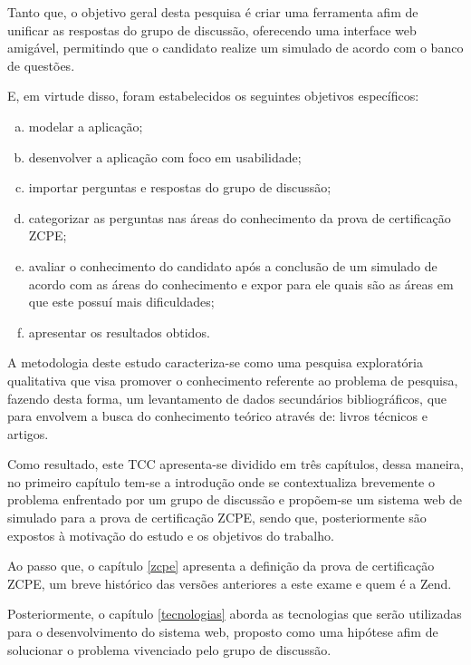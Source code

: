 
Tanto que, o objetivo geral desta pesquisa é criar uma ferramenta afim de
unificar as respostas do grupo de discussão, oferecendo uma interface web
amigável, permitindo que o candidato realize um simulado de
acordo com o banco de questões.


E, em virtude disso, foram estabelecidos os seguintes objetivos
específicos:

\begin{enumerate}[a)]
    \item modelar a aplicação;
    \item desenvolver a aplicação com foco em usabilidade;
    \item importar perguntas e respostas do grupo de discussão;
    \item categorizar as perguntas nas áreas do conhecimento da prova de
    certificação \acs{ZCPE};
    \item avaliar o conhecimento do candidato após a conclusão de um simulado 
    de acordo com as áreas do conhecimento e expor para ele quais são as áreas  em
    que este possuí mais dificuldades;
    \item apresentar os resultados obtidos.
\end{enumerate}


A metodologia deste estudo caracteriza-se como uma pesquisa exploratória
qualitativa que visa promover o conhecimento referente ao problema de pesquisa, fazendo desta forma,
um levantamento de dados secundários bibliográficos, que para
 envolvem a busca do conhecimento 
teórico através de: livros técnicos e artigos.

Como resultado, este \acs{TCC} apresenta-se dividido em três capítulos, dessa
maneira, no primeiro capítulo tem-se a introdução onde se contextualiza brevemente o problema
enfrentado por um grupo de discussão e propõem-se um sistema web de
simulado para a prova de certificação \acs{ZCPE}, sendo que, posteriormente são
expostos à motivação do estudo e os objetivos do trabalho.

Ao passo que, o capítulo \ref{zcpe} apresenta a definição da prova de
certificação \acl{ZCPE}, um breve histórico das versões anteriores a este
exame e quem é a \acs{Zend}.

Posteriormente, o capítulo \ref{tecnologias} aborda as tecnologias que serão
utilizadas para o desenvolvimento do sistema web, proposto como uma hipótese 
afim de solucionar o problema vivenciado pelo grupo de discussão.


